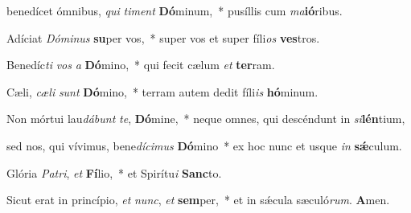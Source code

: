 \item benedícet ómnibus, \textit{qui} \textit{timent} \textbf{Dó}minum,~* pusíllis cum \textit{ma}\textbf{ió}ribus.

\item Adíciat \textit{Dóminus} \textbf{su}per vos,~* super vos et super fíli\textit{os} \textbf{ves}tros.

\item Benedíc\textit{ti} \textit{vos} \textit{a} \textbf{Dó}mino,~* qui fecit cælum \textit{et} \textbf{ter}ram.

\item Cæli, \textit{cæli} \textit{sunt} \textbf{Dó}mino,~* terram autem dedit fíli\textit{is} \textbf{hó}minum.

\item Non mórtui lau\textit{dábunt} \textit{te}, \textbf{Dó}mine,~* neque omnes, qui descéndunt in \textit{si}\textbf{lén}tium,

\item sed nos, qui vívimus, bene\textit{dícimus} \textbf{Dó}mino~* ex hoc nunc et usque \textit{in} \textbf{sǽ}culum.

\item Glória \textit{Patri}, \textit{et} \textbf{Fí}lio,~* et Spirítu\textit{i} \textbf{Sanc}to.

\item Sicut erat in princípio, \textit{et} \textit{nunc}, \textit{et} \textbf{sem}per,~* et in sǽcula sæculó\textit{rum}. \textbf{A}men.

